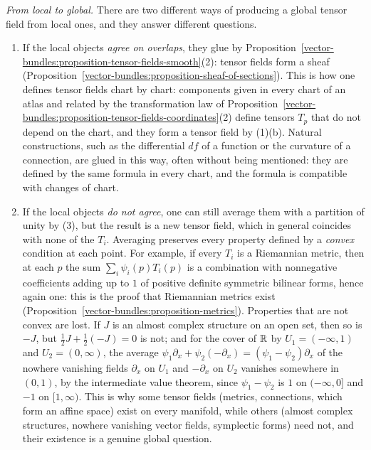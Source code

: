 \begin{remark}\label{vector-bundles:remark-local-to-global}
\emph{From local to global.} There are two different ways of producing a global tensor field from local ones, and they answer different questions.
\begin{enumerate}
\item If the local objects \emph{agree on overlaps}, they glue by Proposition~\ref{vector-bundles:proposition-tensor-fields-smooth}(2): tensor fields form a sheaf
(Proposition~\ref{vector-bundles:proposition-sheaf-of-sections}). This is how one defines tensor fields chart by chart: components given in every chart of an atlas and related by the transformation law of
Proposition~\ref{vector-bundles:proposition-tensor-fields-coordinates}(2) define tensors $T_p$ that do not depend on the chart, and they form a tensor field by (1)(b). Natural constructions, such as the
differential $df$ of a function or the curvature of a connection, are glued in this way, often without being mentioned: they are defined by the same formula in every chart, and the formula is compatible with
changes of chart.
\item If the local objects \emph{do not agree}, one can still average them with a partition of unity by (3), but the result is a new tensor field, which in general coincides with none of the $T_i$. Averaging
preserves every property defined by a \emph{convex} condition at each point. For example, if every $T_i$ is a Riemannian metric, then at each $p$ the sum $\sum_i\psi_i(p)T_i(p)$ is a combination with nonnegative
coefficients adding up to $1$ of positive definite symmetric bilinear forms, hence again one: this is the proof that Riemannian metrics exist
(Proposition~\ref{vector-bundles:proposition-metrics}). Properties that are not convex are lost. If $J$ is an almost complex structure on an open set, then so is $-J$, but $\frac12J + \frac12(-J) = 0$ is not; and for the
cover of $\mathbb{R}$ by $U_1 = (-\infty, 1)$ and $U_2 = (0, \infty)$, the average $\psi_1\partial_x + \psi_2(-\partial_x) = (\psi_1 - \psi_2)\partial_x$ of the nowhere vanishing fields $\partial_x$ on $U_1$ and $-\partial_x$ on $U_2$
vanishes somewhere in $(0, 1)$, by the intermediate value theorem, since $\psi_1 - \psi_2$ is $1$ on $(-\infty, 0]$ and $-1$ on $[1, \infty)$. This is why some tensor fields
(metrics, connections, which form an affine space) exist on every manifold, while others (almost complex structures, nowhere vanishing vector fields, symplectic forms) need not, and their existence is a
genuine global question.
\end{enumerate}
\end{remark}

